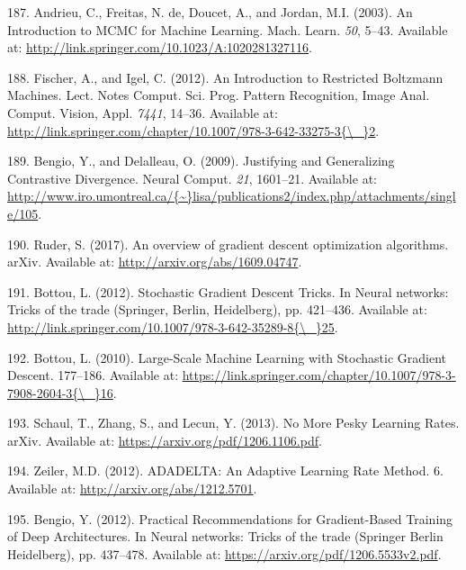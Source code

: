 \documentclass[11pt,a4paper,twoside]{book}
\theoremstyle{definition}
\theoremstyle{definition}
\theoremstyle{remark}
\begin{document}
\hypertarget{ref-Andrieu2003}{}
187. Andrieu, C., Freitas, N. de, Doucet, A., and Jordan, M.I. (2003).
An Introduction to MCMC for Machine Learning. Mach. Learn. \emph{50},
5--43. Available at:
\url{http://link.springer.com/10.1023/A:1020281327116}.

\hypertarget{ref-Fischer2012}{}
188. Fischer, A., and Igel, C. (2012). An Introduction to Restricted
Boltzmann Machines. Lect. Notes Comput. Sci. Prog. Pattern Recognition,
Image Anal. Comput. Vision, Appl. \emph{7441}, 14--36. Available at:
\href{http://link.springer.com/chapter/10.1007/978-3-642-33275-3\%7B/_\%7D2}{http://link.springer.com/chapter/10.1007/978-3-642-33275-3\{\textbackslash{}\_\}2}.

\hypertarget{ref-Bengio2009}{}
189. Bengio, Y., and Delalleau, O. (2009). Justifying and Generalizing
Contrastive Divergence. Neural Comput. \emph{21}, 1601--21. Available
at:
\href{http://www.iro.umontreal.ca/\%7B~\%7Dlisa/publications2/index.php/attachments/single/105}{http://www.iro.umontreal.ca/\{\textasciitilde{}\}lisa/publications2/index.php/attachments/single/105}.

\hypertarget{ref-Ruder2017}{}
190. Ruder, S. (2017). An overview of gradient descent optimization
algorithms. arXiv. Available at: \url{http://arxiv.org/abs/1609.04747}.

\hypertarget{ref-Bottou2012}{}
191. Bottou, L. (2012). Stochastic Gradient Descent Tricks. In Neural
networks: Tricks of the trade (Springer, Berlin, Heidelberg), pp.
421--436. Available at:
\href{http://link.springer.com/10.1007/978-3-642-35289-8\%7B/_\%7D25}{http://link.springer.com/10.1007/978-3-642-35289-8\{\textbackslash{}\_\}25}.

\hypertarget{ref-Bottou2010}{}
192. Bottou, L. (2010). Large-Scale Machine Learning with Stochastic
Gradient Descent. 177--186. Available at:
\href{https://link.springer.com/chapter/10.1007/978-3-7908-2604-3\%7B/_\%7D16}{https://link.springer.com/chapter/10.1007/978-3-7908-2604-3\{\textbackslash{}\_\}16}.

\hypertarget{ref-Schaul2013}{}
193. Schaul, T., Zhang, S., and Lecun, Y. (2013). No More Pesky Learning
Rates. arXiv. Available at: \url{https://arxiv.org/pdf/1206.1106.pdf}.

\hypertarget{ref-Zeiler2012}{}
194. Zeiler, M.D. (2012). ADADELTA: An Adaptive Learning Rate Method. 6.
Available at: \url{http://arxiv.org/abs/1212.5701}.

\hypertarget{ref-Bengio2012}{}
195. Bengio, Y. (2012). Practical Recommendations for Gradient-Based
Training of Deep Architectures. In Neural networks: Tricks of the trade
(Springer Berlin Heidelberg), pp. 437--478. Available at:
\url{https://arxiv.org/pdf/1206.5533v2.pdf}.
\end{document}
